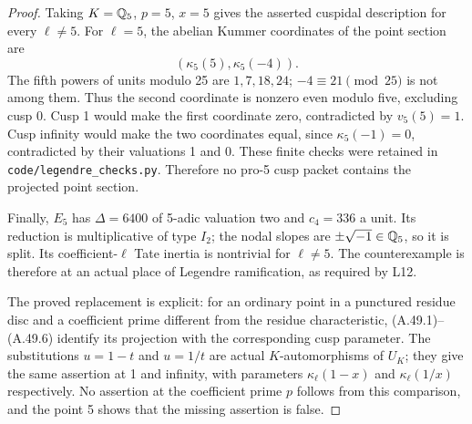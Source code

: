 \begin{proof}
Taking $K=\mathbb Q_5$, $p=5$, $x=5$ gives the asserted cuspidal
description for every $\ell\ne5$.  For $\ell=5$, the abelian
Kummer coordinates of the point section are
\[
                      (\kappa_5(5),\kappa_5(-4)).
\]
The fifth powers of units modulo 25 are $1,7,18,24$;
$-4\equiv21\pmod{25}$ is not among them.  Thus the second
coordinate is nonzero even modulo five, excluding cusp 0.
Cusp 1 would make the first coordinate zero, contradicted by
$v_5(5)=1$.  Cusp infinity would make the two coordinates equal,
since $\kappa_5(-1)=0$, contradicted by their valuations 1 and 0.
These finite checks were retained in
\texttt{code/legendre\_checks.py}.  Therefore no pro-5 cusp packet
contains the projected point section.

Finally, $E_5$ has $\Delta=6400$ of 5-adic valuation two and
$c_4=336$ a unit.  Its reduction is multiplicative of type $I_2$;
the nodal slopes are $\pm\sqrt{-1}\in\mathbb Q_5$, so it is split.
Its coefficient-$\ell$ Tate inertia is nontrivial for
$\ell\ne5$.  The counterexample is therefore at an actual place
of Legendre ramification, as required by L12.

The proved replacement is explicit: for an ordinary point in a
punctured residue disc and a coefficient prime different from the
residue characteristic, (A.49.1)--(A.49.6) identify its projection
with the corresponding cusp parameter.  The substitutions
$u=1-t$ and $u=1/t$ are actual $K$-automorphisms of $U_K$;
they give the same assertion at 1 and infinity, with parameters
$\kappa_\ell(1-x)$ and $\kappa_\ell(1/x)$ respectively.
No assertion at the coefficient prime $p$ follows from this
comparison, and the point 5 shows that the missing assertion
is false.
\end{proof}
